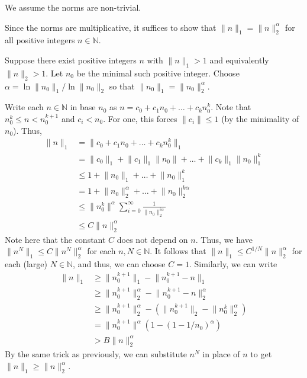 \documentclass[12 pt, letterpaper]{hmcpset}
\begin{document}
\begin{solution}
	We assume the norms are non-trivial.

	Since the norms are multiplicative, it suffices to show that $\lVert n \rVert_{1} = \lVert n \rVert_{2}^{\alpha}$ for all positive integers $n \in \mathbb{N}$.

	Suppose there exist positive integers $n$ with $\lVert n \rVert_{1} > 1$ and equivalently $\lVert n \rVert_{2} > 1$. Let $n_{0}$ be the minimal such positive integer. Choose $\alpha = \ln \lVert n_{0} \rVert_{1} / \ln \lVert n_{0} \rVert_{2}$ so that $\lVert n_{0} \rVert_{1} = \lVert n_{0} \rVert_{2}^{\alpha}$. 

	Write each $n \in \mathbb{N}$ in base $n_{0}$ as $n = c_{0} + c_{1} n_{0} + \dots + c_{k} n_{0}^{k}$. Note that  $n_{0}^{k} \le n < n_{0}^{k + 1}$ and $c_{i} < n_{0}$. For one, this forces $\lVert c_{i} \rVert \le 1$ (by the minimality of $n_{0}$). Thus,
	\begin{align*}
		\lVert n \rVert_{1} & = \lVert c_{0} + c_{1} n_{0} + \dots + c_{k} n_{0}^{k} \rVert_{1} \\
				& = \lVert c_{0} \rVert_{1} + \lVert c_{1} \rVert_{1} \lVert n_{0} \rVert + \dots + \lVert c_{k} \rVert_{1} \lVert n_{0} \rVert_{1}^{k} \\
				& \le 1 + \lVert n_{0} \rVert_{1} + \dots + \lVert n_{0} \rVert_{1}^{k} \\
				& = 1 + \lVert n_{0} \rVert_{2}^{\alpha} + \dots + \lVert n_{0} \rVert_{2}^{k \alpha} \\
				& \le \lVert n_{0}^{k} \rVert^{\alpha} \sum_{i = 0}^{\infty} \frac{1}{\lVert n_{0} \rVert_{2}^{i \alpha}} \\
				& \le C \lVert n \rVert_{2}^{\alpha}
	\end{align*}
	Note here that the constant $C$ does not depend on $n$. Thus, we have $\lVert n^{N} \rVert_{1} \le C \lVert n^{N} \rVert_{2}^{\alpha}$ for each $n, N \in \mathbb{N}$. It follows that $\lVert n \rVert_{1} \le C^{1 / N} \lVert n \rVert_{2}^{\alpha}$ for each (large) $N \in \mathbb{N}$, and thus, we can choose $C = 1$. Similarly, we can write
	\begin{align*}
		\lVert n \rVert_{1} & \ge \lVert n_{0}^{k + 1} \rVert_{1} - \lVert n_{0}^{k + 1} - n \rVert_{1} \\
				    & \ge \lVert n_{0}^{k + 1} \rVert_{2}^{\alpha} - \lVert n_{0}^{k + 1} - n \rVert_{2}^{\alpha} \\
				    & \ge \lVert n_{0}^{k + 1} \rVert_{2}^{\alpha} - (\lVert n_{0}^{k + 1} \rVert_{2} - \lVert n_{0}^{k} \rVert_{2}^{\alpha}) \\
				    & = \lVert n_{0}^{k + 1} \rVert^{\alpha} (1 - (1 - 1 / n_{0})^{\alpha}) \\
				    & > B \lVert n \rVert_{2}^{\alpha}
	\end{align*}
	By the same trick as previously, we can substitute $n^{N}$ in place of $n$ to get $\lVert n \rVert_{1} \ge \lVert n \rVert_{2}^{\alpha}$.


\end{solution}
\end{document}
